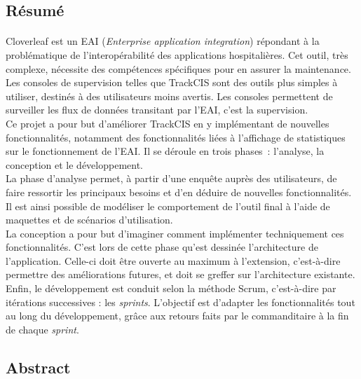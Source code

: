 \subsection*{Résumé}
	\paragraph{}
	Cloverleaf est un EAI (\textit{Enterprise application integration}) répondant à
	la problématique de l'interopérabilité des applications hospitalières. Cet outil,
	très complexe, nécessite des compétences spécifiques pour en assurer la
	maintenance. Les consoles de supervision telles que TrackCIS sont des outils
	plus simples à utiliser, destinés à des utilisateurs moins avertis. Les
	consoles permettent de surveiller les flux de données transitant par
	l'EAI, c'est la supervision.\\
	Ce projet a pour but d'améliorer TrackCIS en y implémentant de nouvelles
	fonctionnalités, notamment des fonctionnalités liées à l'affichage de
	statistiques sur le fonctionnement de l'EAI.
	Il se déroule en trois phases~:
	l'analyse, la conception et le développement.\\
	La phase d'analyse permet, à partir d'une enquête auprès des utilisateurs, de
	faire ressortir les principaux besoins et d'en déduire de nouvelles
	fonctionnalités. Il est ainsi possible de modéliser le comportement de
	l'outil final à l'aide de maquettes et de scénarios d'utilisation.\\
	La conception a pour but d'imaginer comment implémenter techniquement ces
	fonctionnalités. C'est lors de cette phase qu'est dessinée l'architecture de
	l'application. Celle-ci doit être ouverte au maximum à l'extension,
	c'est-à-dire permettre des améliorations futures, et doit se greffer sur
	l'architecture existante.\\
	Enfin, le développement est conduit selon la méthode Scrum, c'est-à-dire par
	itérations successives :
	les \textit{sprints}. L'objectif est d'adapter les fonctionnalités tout au long
	du développement, grâce aux retours faits par le commanditaire à la fin de
	chaque \textit{sprint}.
	
\subsection*{Abstract}
